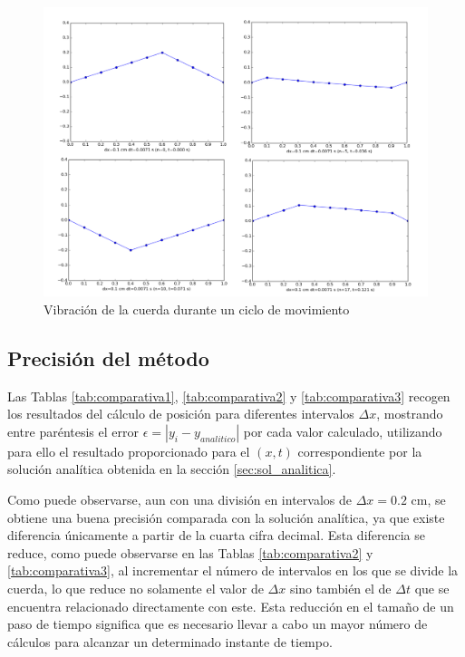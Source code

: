 \documentclass[11pt]{article}
\begin{document}
\begin{figure}
\centering
\includegraphics[width=1.0\linewidth]{graficas.pdf}
\caption{Vibración de la cuerda durante un ciclo de movimiento}
\label{fig:graficas}
\end{figure}

\subsection{Precisión del método}
Las Tablas \ref{tab:comparativa1}, \ref{tab:comparativa2} y \ref{tab:comparativa3} recogen
los resultados del cálculo de posición para diferentes intervalos $\Delta{x}$, mostrando
entre paréntesis el error $\epsilon = |y_i - y_{analitico}|$ por cada valor calculado,
utilizando para ello el resultado proporcionado para el $(x,t)$ correspondiente por la
solución analítica obtenida en la sección \ref{sec:sol_analitica}.

Como puede observarse, aun con una división en intervalos de $\Delta{x} = 0.2$ cm, se 
obtiene una buena precisión comparada con la solución analítica, ya que existe diferencia
únicamente a partir de la cuarta cifra decimal. Esta diferencia se reduce, como puede
observarse en las Tablas \ref{tab:comparativa2} y \ref{tab:comparativa3}, al incrementar
el número de intervalos en los que se divide la cuerda, lo que reduce no solamente el
valor de $\Delta{x}$ sino también el de $\Delta{t}$ que se encuentra relacionado
directamente con este. Esta reducción en el tamaño de un paso de tiempo significa que es
necesario llevar a cabo un mayor número de cálculos para alcanzar un determinado instante
de tiempo.
\end{document}
